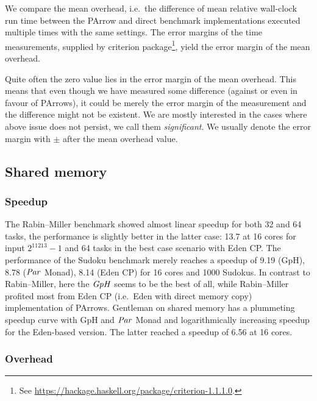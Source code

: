 \documentclass[paper=A4,twoside=true,openright,parskip=full,chapterprefix=true,headings=normal,bibliography=totoc,listof=totoc,titlepage=on,captions=tableabove,draft=false,british]{scrreprt}%
\begin{document}
\label{sec:defOverhead}

We compare the mean overhead, i.e.~the difference of mean relative
wall-clock run time between the PArrow and direct benchmark
implementations executed multiple times with the same settings. The
error margins of the time measurements, supplied by criterion
package\footnote{See
  \url{https://hackage.haskell.org/package/criterion-1.1.1.0}.}, yield
the error margin of the mean overhead.

Quite often the zero value lies in the error margin of the mean
overhead. This means that even though we have measured some difference
(against or even in favour of PArrows), it could be merely the error
margin of the measurement and the difference might not be existent. We
are mostly interested in the cases where above issue does not persist,
we call them \emph{significant}. We usually denote the error margin with
\(\pm\) after the mean overhead value.

\hypertarget{shared-memory}{%
\subsection{Shared memory}\label{shared-memory}}

\label{sec:benchmarksSharedMem}

\hypertarget{speedup}{%
\subsubsection{Speedup}\label{speedup}}

The Rabin--Miller benchmark showed almost linear speedup for both 32 and
64 tasks, the performance is slightly better in the latter case: 13.7 at
16 cores for input \(2^{11213}-1\) and 64 tasks in the best case
scenario with Eden CP. The performance of the Sudoku benchmark merely
reaches a speedup of 9.19 (GpH), 8.78 (\ensuremath{\Conid{Par}} Monad), 8.14 (Eden CP) for
16 cores and 1000 Sudokus. In contrast to Rabin--Miller, here the \ensuremath{\Conid{GpH}}
seems to be the best of all, while Rabin--Miller profited most from Eden
CP (i.e.~Eden with direct memory copy) implementation of PArrows.
Gentleman on shared memory has a plummeting speedup curve with GpH and
\ensuremath{\Conid{Par}} Monad and logarithmically increasing speedup for the Eden-based
version. The latter reached a speedup of 6.56 at 16 cores.

\hypertarget{overhead}{%
\subsubsection{Overhead}\label{overhead}}
\end{document}

